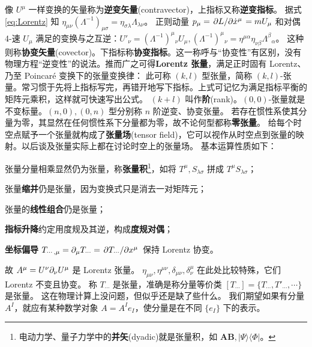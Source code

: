 像 $U^\mu$ 一样变换的矢量称为\textbf{逆变矢量}(contravector)，上指标又称\textbf{逆变指标}。
据式 \eqref{eq:Lorentz} 知 $\eta_{\mu\nu}(\Lambda^{-1})_{\mu\sigma}=\eta_{\sigma\lambda}\Lambda_{\lambda\nu}$。
正则动量 $p_\mu=\pdv*{L}{\dot x^\mu}=mU_\mu$ 和对偶 4-速 $U_\mu$ 满足的变换与之互逆：$U'_\nu=(\Lambda^{-1})^{\mu}{}_{\nu} U_\mu, (\Lambda^{-1})^{\mu}{}_{\nu}=\eta^{\mu\alpha}\eta_{\nu\beta}\Lambda^{\beta}{}_{\alpha}$。
这种则称\textbf{协变矢量}(covector)。下指标称\textbf{协变指标}。这一称呼与“协变性”有区别，没有物理方程“逆变性”的说法。推而广之可得\textbf{Lorentz 张量}，满足正时固有 Lorentz、乃至 Poincaré 变换下的张量变换律：
此可称 $(k,l)$ 型张量，简称 $(k,l)$-张量。常习惯于先将上指标写完，再错开地写下指标。上式可记忆为满足指标平衡的矩阵元乘积，这样就可快速写出公式。
$(k+l)$ 叫作\textbf{阶}(rank)。$(0,0)$-张量就是不变标量。$(n,0),(0,n)$ 型分别称 $n$ 阶逆变、协变张量。
若存在惯性系使其分量为零，其显然在任何惯性系下分量都为零，故不论何型都称\textbf{零张量}。
给每个时空点赋予一个张量就构成了\textbf{张量场}(tensor field)，它可以视作从时空点到张量的映射。以后谈及张量实际上都在讨论时空上的张量场。
基本运算性质如下：
\begin{compactenum}
    \item 张量分量相乘显然仍为张量，称\textbf{张量积}\footnote{电动力学、量子力学中的\textbf{并矢}(dyadic)就是张量积，如 $\bm A\bm B,|\Psi\rangle\langle\Phi|$。}，如将 $T^\mu,S_{\lambda\sigma}$ 拼成 $T^\mu S_{\lambda\sigma}$；
    \item 张量\textbf{缩并}仍是张量，因为变换式只是消去一对矩阵元；
    \item 张量的\textbf{线性组合}仍是张量；
    \item \textbf{指标升降}约定用度规及其逆，构成\textbf{度规对偶}；
    \item \textbf{坐标偏导} $T_{\cdots,\mu}=\partial_\mu T_{\cdots}=\pdv*{T_{\cdots}}{x^\mu}$ 保持 Lorentz 协变。
\end{compactenum}
故 $A^\mu=U^\nu\partial_\nu U^\mu$ 是 Lorentz 张量。
$\eta_{\mu\nu},\eta^{\mu\nu},\delta_{\mu\nu},\delta^\mu_\nu$ 在此处比较特殊，它们 Lorentz 不变且协变。
称 $T_{\cdots}$ 是张量，准确是称分量等价类 $[T_{\cdots}]=\{T_{\cdots},T'_{\cdots},\cdots\}$ 是张量。
这在物理计算上没问题，但似乎还是缺了些什么。
我们期望如果有分量 $A^I$，就应有某种数学对象 $A=A^I e_I$，使分量是在不同 $\{e_I\}$ 下的表示。
